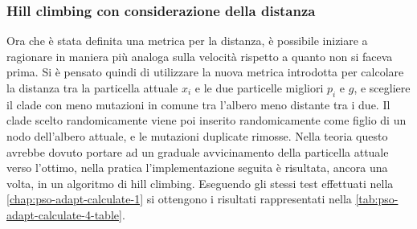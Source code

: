 \subsubsection{Hill climbing con considerazione della distanza}
\label{chap:pso-adapt-calculate-4}
Ora che è stata definita una metrica per la distanza, è possibile iniziare a ragionare in maniera più analoga sulla velocità rispetto a quanto non si faceva prima. Si è pensato quindi di utilizzare la nuova metrica introdotta per calcolare la distanza tra la particella attuale $x_i$ e le due particelle migliori $p_i$ e $g$, e scegliere il clade con meno mutazioni in comune tra l'albero meno distante tra i due. Il clade scelto randomicamente viene poi inserito randomicamente come figlio di un nodo dell'albero attuale, e le mutazioni duplicate rimosse. Nella teoria questo avrebbe dovuto portare ad un graduale avvicinamento della particella attuale verso l'ottimo, nella pratica l'implementazione seguita è risultata, ancora una volta, in un algoritmo di hill climbing.
Eseguendo gli stessi test effettuati nella \autoref{chap:pso-adapt-calculate-1} si ottengono i risultati rappresentati nella \autoref{tab:pso-adapt-calculate-4-table}. 

